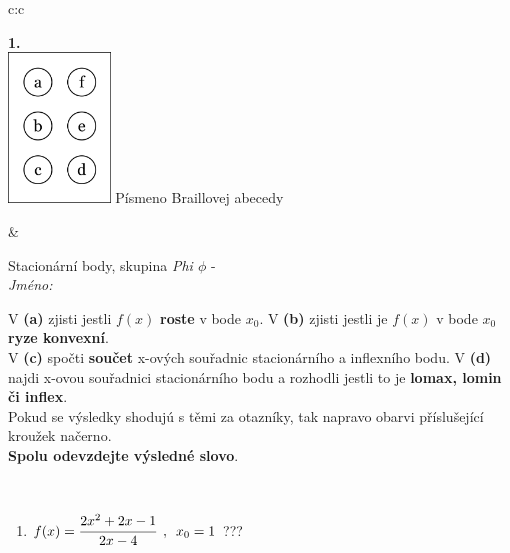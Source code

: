 \documentclass[10pt]{report}
\begin{document}
\begin{tabular}{c:c}
\begin{minipage}[c][104.5mm][t]{0.5\linewidth}
\begin{center}
\begin{minipage}{0.79\linewidth}
\end{minipage}
\begin{minipage}{0.20\linewidth}
\begin{center}
{\Huge\bfseries 1.} \\[2mm]
\includegraphics[height=40mm]{../images/braille.png}
{\small Písmeno Braillovej abecedy}
\end{center}
\end{minipage}
\end{center}
\end{minipage}
&
\begin{minipage}[c][104.5mm][t]{0.5\linewidth}
\begin{center}
\vspace{7mm}
{\huge Stacionární body, skupina \textit{Phi $\phi$} -}\\[5mm]
\textit{Jméno:}\phantom{xxxxxxxxxxxxxxxxxxxxxxxxxxxxxxxxxxxxxxxxxxxxxxxxxxxxxxxxxxxxxxxxx}\\[5mm]
\begin{minipage}{0.95\linewidth}
\begin{center}
{\small V \textbf{(a)} zjisti jestli $f(x)$ \textbf{roste} v bode $x_0$. V \textbf{(b)} zjisti jestli je $f(x)$ v bode $x_0$ \textbf{ryze konvexní}.\\V \textbf{(c)} spočti \textbf{součet} x-ových souřadnic stacionárního a inflexního bodu. V \textbf{(d)} najdi x-ovou souřadnici stacionárního bodu a rozhodli jestli to je \textbf{lomax, lomin či inflex}.\\Pokud se výsledky shodujú s těmi za otazníky, tak napravo obarvi příslušející kroužek načerno.\\\textbf{Spolu odevzdejte výsledné slovo}}.
\end{center}
\end{minipage}
\\[1mm]
\begin{minipage}{0.79\linewidth}
\begin{center}
\begin{varwidth}{\linewidth}
\begin{enumerate}
\normalsize
\item $f(x)=\cfrac{2x^2+2x-1}{2x-4}\enspace , \enspace x_0=1$\quad \dotfill\; ???\;\dotfill \quad {}

\end{enumerate}
\end{varwidth}
\end{center}
\end{minipage}
\end{center}
\end{minipage}
\end{tabular}
\end{document}
